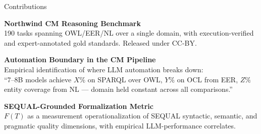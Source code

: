 \documentclass[aspectratio=169]{beamer}
\begin{document}
\begin{frame}{Contributions}

\begin{description}[C3:]
    \item[C1:] \textbf{Northwind CM Reasoning Benchmark}\\
    190 tasks spanning OWL/EER/NL over a single domain, with execution-verified and expert-annotated gold standards. Released under CC-BY.

    \vspace{0.5em}
    \item[C2:] \textbf{Automation Boundary in the CM Pipeline}\\
    Empirical identification of where LLM automation breaks down:\\
    {\small ``7--8B models achieve $X\%$ on SPARQL over OWL, $Y\%$ on OCL from EER, $Z\%$ entity coverage from NL --- domain held constant across all comparisons.''}

    \vspace{0.5em}
    \item[C3:] \textbf{SEQUAL-Grounded Formalization Metric}\\
    $F(T)$ as a measurement operationalization of SEQUAL syntactic, semantic, and pragmatic quality dimensions, with empirical LLM-performance correlates.
\end{description}

\end{frame}
\end{document}
